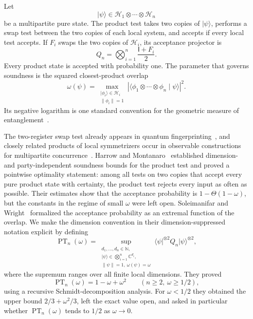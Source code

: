 \documentclass[11pt]{article}
\theoremstyle{definition}
\theoremstyle{remark}
\newcommand{\C}{\mathbb{C}}
\newcommand{\id}{\mathsf{I}}
\newcommand{\PT}{\operatorname{PT}}
\newcommand{\ket}[1]{\lvert #1\rangle}
\newcommand{\bra}[1]{\langle #1\rvert}
\newcommand{\braket}[2]{\langle #1\mid #2\rangle}
\begin{document}
Let
\[
  \ket{\psi}\in \mathcal H_1\otimes\cdots\otimes\mathcal H_n
\]
be a multipartite pure state.  The product test takes two copies of
$\ket\psi$, performs a swap test between the two copies of each local
system, and accepts if every local test accepts.  If $F_i$ swaps the two
copies of $\mathcal H_i$, its acceptance projector is
\begin{equation}\label{eq:product-projector-intro}
  Q_n=\bigotimes_{i=1}^n \frac{\id+F_i}{2}.
\end{equation}
Every product state is accepted with probability one.  The parameter that
governs soundness is the squared closest-product overlap
\begin{equation}\label{eq:omega-intro}
  \omega(\psi)
  =\max_{\substack{\ket{\phi_i}\in\mathcal H_i\\
                      \|\phi_i\|=1}}
    \left|\braket{\phi_1\otimes\cdots\otimes\phi_n}{\psi}\right|^2.
\end{equation}
Its negative logarithm is one standard convention for the geometric
measure of entanglement~\cite{WeiGoldbart03}.

The two-register swap test already appears in quantum
fingerprinting~\cite{BuhrmanEtAl01}, and closely related products of local
symmetrizers occur in observable constructions for multipartite
concurrence~\cite{MintertKusBuchleitner05}.  Harrow and
Montanaro~\cite{HarrowMontanaro13} established
dimension- and party-independent soundness bounds for the product test and
proved a pointwise optimality statement: among all tests on two copies that
accept every pure product state with certainty, the product test rejects
every input as often as possible.  Their estimates show that the acceptance
probability is $1-\Theta(1-\omega)$, but the constants in the regime of
small $\omega$ were left open.  Soleimanifar and
Wright~\cite{SoleimanifarWright22} formalized the acceptance probability as
an extremal function of the overlap.  We make the dimension convention in
their dimension-suppressed notation explicit by defining
\begin{equation}\label{eq:PT-definition-intro}
  \PT_n(\omega)
  =\sup_{\substack{d_1,\ldots,d_n\in\mathbb N,\\
                    \ket\psi\in\bigotimes_{i=1}^n\C^{d_i},\\
                    \|\psi\|=1,\ \omega(\psi)=\omega}}
       \bra{\psi}^{\otimes2}Q_n\ket{\psi}^{\otimes2},
\end{equation}
where the supremum ranges over all finite local dimensions.  They proved
\[
  \PT_n(\omega)=1-\omega+\omega^2
  \qquad (n\geq2,\ \omega\geq1/2),
\]
using a recursive Schmidt-decomposition analysis.  For $\omega<1/2$ they
obtained the upper bound $2/3+\omega^2/3$, left the exact value open, and
asked in particular whether $\PT_n(\omega)$ tends to $1/2$ as
$\omega\to0$.
\end{document}
